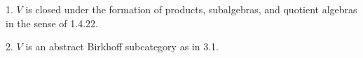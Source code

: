 1. $V$ is closed under the formation of products, subalgebras, and quotient algebras in the sense of 1.4.22.

2. $V$ is an abstract Birkhoff subcategory as in 3.1.